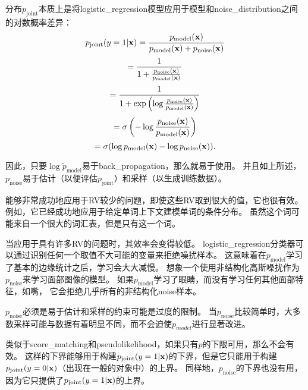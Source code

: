 分布$p_{\text{joint}}$本质上是将\gls{logistic_regression}模型应用于模型和\gls{noise_distribution}之间的对数概率差异：
\begin{equation}
	p_{\text{joint}} (y = 1 | \mathbf{x}) = \frac{ p_{\text{model}}(\mathbf{x}) }{ p_{\text{model}}(\mathbf{x}) + p_{\text{noise}}(\mathbf{x}) }
\end{equation}
\begin{equation}
 = \frac{1}{1 + \frac{ p_{\text{noise}}(\mathbf{x}) }{ p_{\text{model}}(\mathbf{x}) }}
\end{equation}
\begin{equation}
= \frac{1}{1 + \exp \left( \log \frac{ p_{\text{noise}}(\mathbf{x}) }{ p_{\text{model}}(\mathbf{x}) } \right)}
\end{equation}
\begin{equation}
	= \sigma \left( - \log \frac{ p_{\text{noise}} (\mathbf{x}) }{ p_{\text{model}} (\mathbf{x}) } \right)
\end{equation}
\begin{equation}
	= \sigma ( \log p_{\text{model}} (\mathbf{x}) - \log p_{\text{noise}} (\mathbf{x})  ) .
\end{equation}


因此，只要$\log \tilde{p}_{\text{model}}$易于\gls{back_propagation}，那么就易于使用。
并且如上所述，$p_{\text{noise}}$易于估计（以便评估$p_{\text{joint}}$）和采样（以生成训练数据）。


能够非常成功地应用于\gls{RV}较少的问题，即使这些\gls{RV}取到很大的值，它也很有效。
例如，它已经成功地应用于给定单词上下文建模单词的条件分布\citep{Mnih2013}。
虽然这个词可能来自一个很大的词汇表，但是只有这一个词。


当应用于具有许多\gls{RV}的问题时，其效率会变得较低。
\gls{logistic_regression}分类器可以通过识别任何一个取值不大可能的变量来拒绝噪扰样本。
这意味着在$p_{\text{model}}$学习了基本的边缘统计之后，学习会大大减慢。
想象一个使用非结构化高斯噪扰作为$p_{\text{noise}}$来学习面部图像的模型。
如果$p_{\text{model}}$学习了眼睛，而没有学习任何其他面部特征，如嘴， 它会拒绝几乎所有的非结构化\gls{noise}样本。


$p_{\text{noise}}$必须是易于估计和采样的约束可能是过度的限制。
当$p_{\text{noise}}$比较简单时，大多数采样可能与数据有着明显不同，而不会迫使$p_{model}$进行显著改进。


类似于\gls{score_matching}和\gls{pseudolikelihood}，如果只有$p$的下限可用，那么不会有效。
这样的下界能够用于构建$p_{\text{joint}}( y = 1 | \mathbf{x})$的下界，但是它只能用于构建$p_{\text{joint}}(y = 0 | \mathbf{x})$（出现在一般的对象中）的上界。
同样地，$p_{\text{noise}}$的下界也没有用，因为它只提供了$p_{\text{joint}}( y = 1 | \mathbf{x})$的上界。


